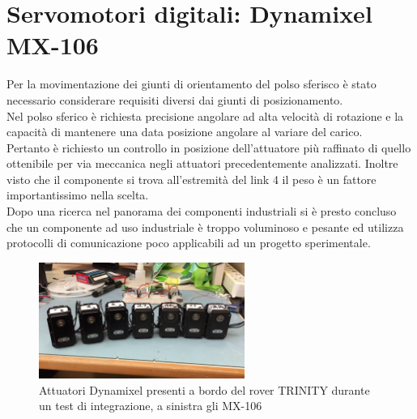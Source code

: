\documentclass[%
corpo=11pt,
twoside,
 stile=classica,
oldstyle,
greek,%
]{toptesi}
\begin{document}
	
	
	
		
	\section{Servomotori digitali: Dynamixel MX-106}
	Per la movimentazione dei giunti di orientamento del polso sferisco è stato necessario considerare requisiti diversi dai giunti di posizionamento.\\
	 Nel polso sferico è richiesta precisione angolare ad alta velocità di rotazione e la capacità di mantenere una data posizione angolare al variare del carico.\\
	  Pertanto è richiesto un controllo in posizione dell'attuatore più raffinato di quello ottenibile per via meccanica negli attuatori precedentemente analizzati. Inoltre visto che il componente si trova all'estremità del link 4 il peso è un fattore importantissimo nella scelta. \\
	Dopo una ricerca nel panorama dei componenti industriali si è presto concluso che un componente ad uso industriale è troppo voluminoso e pesante ed utilizza protocolli di comunicazione poco applicabili ad un progetto sperimentale. 
	
	\begin{figure}
		\centering
		\includegraphics[width=0.6\textwidth]{image/dynamixel.png}
		\caption{Attuatori Dynamixel presenti a bordo del rover TRINITY durante un test di integrazione, a sinistra gli MX-106}
		\label{fig:MX160}
	\end{figure}
\end{document}
